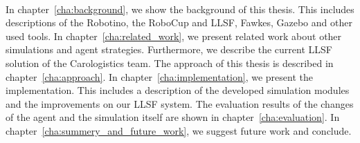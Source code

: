 \\
In chapter~\ref{cha:background}, we show the background of this thesis. This includes descriptions of the Robotino, the RoboCup and LLSF, Fawkes, Gazebo and other used tools. In chapter~\ref{cha:related_work}, we present related work about other simulations and agent strategies. Furthermore, we describe the current LLSF solution of the Carologistics team. The approach of this thesis is described in chapter~\ref{cha:approach}. In chapter~\ref{cha:implementation}, we present the implementation. This includes a description of the developed simulation modules and the improvements on our LLSF system. The evaluation results of the changes of the agent and the simulation itself are shown in chapter~\ref{cha:evaluation}. In chapter~\ref{cha:summery_and_future_work}, we suggest future work and conclude.



